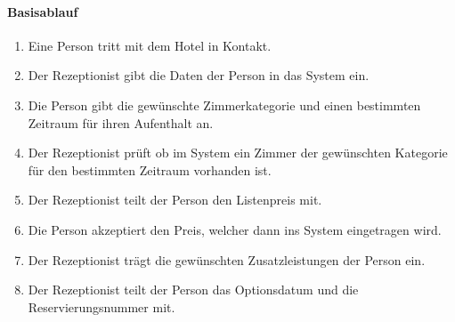 \paragraph{Basisablauf}
\begin{enumerate}
	\item Eine Person tritt mit dem Hotel in Kontakt.
	\item Der \Gls{Rezeptionist} gibt die Daten der Person in das System ein.
	\item Die Person gibt die gewünschte Zimmerkategorie und einen bestimmten Zeitraum für ihren Aufenthalt an. 
    \item Der \Gls{Rezeptionist} prüft ob im System ein Zimmer der gewünschten
    Kategorie für den bestimmten Zeitraum vorhanden ist.
	\item Der \Gls{Rezeptionist} teilt der Person den Listenpreis mit.
	\item Die Person akzeptiert den Preis, welcher dann ins System eingetragen wird.
	\item Der \Gls{Rezeptionist} trägt die gewünschten \Gls{Zusatzleistung}en der Person ein.
	\item Der \Gls{Rezeptionist} teilt der Person das \Gls{Optionsdatum} und die \Gls{Reservierungsnummer} mit.
\end{enumerate}

